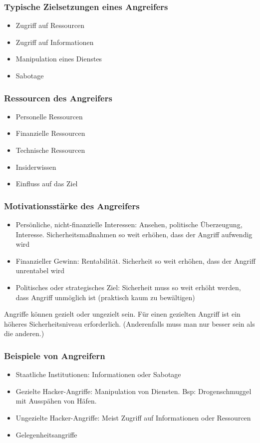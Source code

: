 \subsubsection{Typische Zielsetzungen eines Angreifers}
\begin{itemize}
	\item Zugriff auf Ressourcen
	\item Zugriff auf Informationen
	\item Manipulation eines Dienstes
	\item Sabotage
\end{itemize}

\subsubsection{Ressourcen des Angreifers}
\begin{itemize}
	\item Personelle Ressourcen
	\item Finanzielle Ressourcen
	\item Technische Ressourcen
	\item Insiderwissen
	\item Einfluss auf das Ziel
\end{itemize}

\subsubsection{Motivationsstärke des Angreifers}
\begin{itemize}
	\item Persönliche, nicht-finanzielle Interessen: Ansehen, politische Überzeugung, Interesse. Sicherheitsmaßnahmen so weit erhöhen, dass der Angriff aufwendig wird
	\item Finanzieller Gewinn: Rentabilität. Sicherheit so weit erhöhen, dass der Angriff unrentabel wird
	\item Politisches oder strategisches Ziel: Sicherheit muss so weit erhöht werden, dass Angriff unmöglich ist (praktisch kaum zu bewältigen)
\end{itemize}

Angriffe können gezielt oder ungezielt sein. Für einen gezielten Angriff ist ein höheres Sicherheitsniveau erforderlich. (Anderenfalls muss man nur besser sein als die anderen.)

\subsubsection{Beispiele von Angreifern}
\begin{itemize}
	\item Staatliche Institutionen: Informationen oder Sabotage
	\item Gezielte Hacker-Angriffe: Manipulation von Diensten. Bsp: Drogenschmuggel mit Ausspähen von Häfen.
	\item Ungezielte Hacker-Angriffe: Meist Zugriff auf Informationen oder Ressourcen
	\item Gelegenheitsangriffe
\end{itemize}


